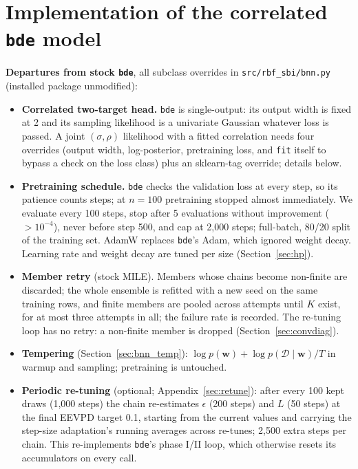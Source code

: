 \documentclass[11pt]{article}
\newcommand{\code}[1]{\texttt{#1}}
\begin{document}
\section{Implementation of the correlated \texttt{bde} model}
\begingroup\raggedright
\label{app:bde}
\label{app:impl}
\textbf{Departures from stock \code{bde}}, all subclass overrides in \code{src/rbf\_sbi/bnn.py} (installed package unmodified):
\begin{itemize}
\item \textbf{Correlated two-target head.} \code{bde} is single-output: its output width is fixed at 2 and its
  sampling likelihood is a univariate Gaussian whatever loss is passed. A joint $(\sigma,\rho)$ likelihood with a
  fitted correlation needs four overrides (output width, log-posterior, pretraining loss, and \code{fit} itself
  to bypass a check on the loss class) plus an sklearn-tag override; details below.
\item \textbf{Pretraining schedule.} \code{bde} checks the validation loss at every step, so its patience counts
  steps; at $n=100$ pretraining stopped almost immediately. We evaluate every 100 steps, stop after 5
  evaluations without improvement ($>10^{-4}$), never before step 500, and cap at 2{,}000 steps; full-batch,
  80/20 split of the training set. AdamW replaces \code{bde}'s Adam, which ignored weight decay. Learning rate
  and weight decay are tuned per size (Section~\ref{sec:hp}).
\item \textbf{Member retry} (stock MILE). Members whose chains become non-finite are discarded; the whole ensemble
  is refitted with a new seed on the same training rows, and finite members are pooled across attempts until $K$
  exist, for at most three attempts in all; the failure rate is recorded. The re-tuning loop has no retry: a
  non-finite member is dropped (Section~\ref{sec:convdiag}).
\item \textbf{Tempering} (Section~\ref{sec:bnn_temp}): $\log p(\mathbf w)+\log p(\mathcal{D}\mid\mathbf w)/T$
  in warmup and sampling; pretraining is untouched.
\item \textbf{Periodic re-tuning} (optional; Appendix~\ref{sec:retune}): after every 100 kept draws (1{,}000
  steps) the chain re-estimates $\epsilon$ (200 steps) and $L$ (50 steps) at the final EEVPD target 0.1, starting
  from the current values and carrying the step-size adaptation's running averages across re-tunes; 2{,}500 extra
  steps per chain. This re-implements \code{bde}'s phase I/II loop, which otherwise resets its accumulators on
  every call.
\end{itemize}
\end{document}
